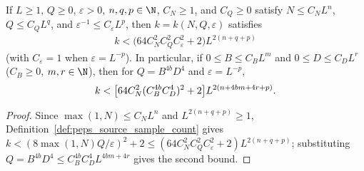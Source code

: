 \begin{lemma}
    \label{thm:peps_source_sampling_polynomial}
    \leanok
    If $L\geq1$, $Q\geq0$, $\varepsilon>0$, $n,q,p\in\N$, $C_N\geq1$, and
    $C_Q\geq0$ satisfy $N\leq C_NL^n$, $Q\leq C_QL^q$, and
    $\varepsilon^{-1}\leq C_\varepsilon L^p$, then $k=k(N,Q,\varepsilon)$
    satisfies
    \begin{align}
        k<\bigl(64C_N^2C_Q^2C_\varepsilon^2+2\bigr)
        L^{2(n+q+p)}
        \label{eq:peps_source_sampling_polynomial}
    \end{align}
    (with $C_\varepsilon=1$ when $\varepsilon=L^{-p}$). In particular, if
    $0\leq B\leq C_BL^m$ and $0\leq D\leq C_DL^r$ ($C_B\ge 0$, $m,r\in\N$), then
    for $Q=B^{4b}D^4$ and $\varepsilon=L^{-p}$,
    \begin{align}
        k<\bigl[64C_N^2(C_B^{4b}C_D^4)^2+2\bigr]
        L^{2(n+4bm+4r+p)}.\notag
    \end{align}
\end{lemma}
\begin{proof}
    \leanok
    Since $\max(1,N)\le C_NL^n$ and $L^{2(n+q+p)}\ge 1$, Definition~\ref{def:peps_source_sample_count}
    gives $k<(8\max(1,N)Q/\varepsilon)^2+2\le (64C_N^2C_Q^2C_\varepsilon^2+2)L^{2(n+q+p)}$;
    substituting $Q=B^{4b}D^4\le C_B^{4b}C_D^4L^{4bm+4r}$ gives the second bound.
\end{proof}

